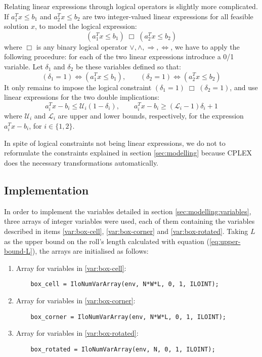 Relating linear expressions through logical operators is slightly more complicated.
If $a_1^Tx \le b_1$ and $a_2^Tx \le b_2$ are two integer-valued linear expressions
for all feasible solution $x$, to model the logical expression:
\[
(a_1^Tx \le b_1) \;\Box\; (a_2^Tx \le b_2)
\]
where $\Box$ is any binary logical operator $\vee,\wedge,\Longrightarrow,\Longleftrightarrow$,
we have to apply the following procedure: for each of the two linear expressions introduce a 0/1
variable. Let $\delta_1$ and $\delta_2$ be these variables defined so that:
\[
(\delta_1 = 1) \Longleftrightarrow (a_1^Tx \le b_1), \qquad 
(\delta_2 = 1) \Longleftrightarrow (a_2^Tx \le b_2)
\]
It only remains to impose the logical constraint $(\delta_1 = 1) \;\Box\; (\delta_2 = 1)$,
and use linear expressions for the two double implications:
\[
a_i^Tx - b_i \le \mathcal{U}_i(1 - \delta_i), \qquad a_i^Tx - b_i \ge (\mathcal{L}_i - 1)\delta_i + 1
\]
where $\mathcal{U}_i$ and $\mathcal{L}_i$ are upper and lower bounds, respectively, for
the expression $a_i^Tx - b_i$, for $i\in\{1,2\}$.

\hfill

In spite of logical constraints not being linear expressions, we do not to reformulate
the constraints explained in section \ref{sec:modelling} because CPLEX does the necessary
transformations automatically.

\subsection{Implementation}
\label{sec:linear-programming:implementation}

In order to implement the variables detailed in section \ref{sec:modelling:variables},
three arrays of integer variables were used, each of them containing the variables described
in items \ref{var:box-cell}, \ref{var:box-corner} and \ref{var:box-rotated}. Taking
$L$ as the upper bound on the roll's length calculated with equation (\ref{eq:upper-bound-L}),
the arrays are initialised as follows:

\begin{enumerate}
	\item Array for variables in \ref{var:box-cell}:
    
	{\NOINDENT \begin{lstlisting}
	box_cell = IloNumVarArray(env, N*W*L, 0, 1, ILOINT);
	\end{lstlisting}}
    
	\item Array for variables in \ref{var:box-corner}:
    
	{\NOINDENT \begin{lstlisting}
	box_corner = IloNumVarArray(env, N*W*L, 0, 1, ILOINT);
	\end{lstlisting}}
    
	\item Array for variables in \ref{var:box-rotated}:
    
	{\NOINDENT \begin{lstlisting}
	box_rotated = IloNumVarArray(env, N, 0, 1, ILOINT);
	\end{lstlisting}}
    
\end{enumerate}


